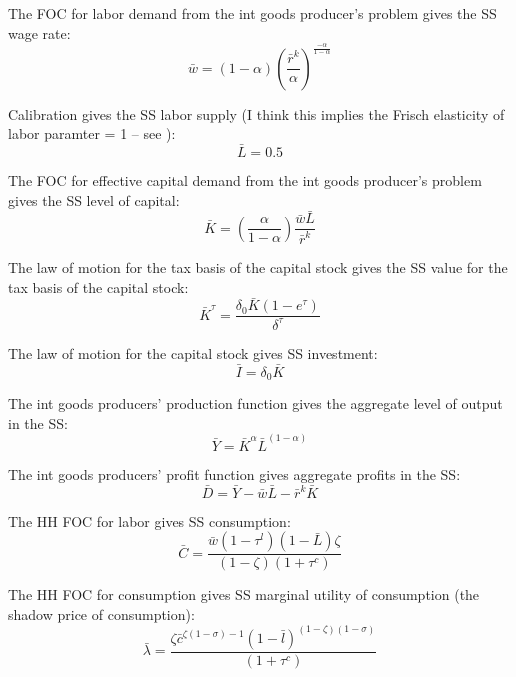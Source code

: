 The FOC for labor demand from the int goods producer's problem gives the SS wage rate:
\begin{equation}
\bar{w} = (1-\alpha)\left(\frac{\bar{r}^{k}}{\alpha}\right)^{\frac{-\alpha}{1-\alpha}}
\end{equation}

Calibration gives the SS labor supply (I think this implies the Frisch elasticity of labor paramter = 1 -- see ):
\begin{equation}
\bar{L} = 0.5
\end{equation}

The FOC for effective capital demand from the int goods producer's problem gives the SS level of capital:
\begin{equation}
\bar{K} = \left(\frac{\alpha}{1-\alpha}\right)\frac{\bar{w}\bar{L}}{\bar{r}^{k}}
\end{equation}

The law of motion for the tax basis of the capital stock gives the SS value for the tax basis of the capital stock:
\begin{equation}
\bar{K}^{\tau} = \frac{\delta_{0}\bar{K}(1-e^{\tau})}{\delta^{\tau}}
\end{equation}

The law of motion for the capital stock gives SS investment:
\begin{equation}
\bar{I} = \delta_{0}\bar{K}
\end{equation}

The int goods producers' production function gives the aggregate level of output in the SS:
\begin{equation}
\bar{Y} = \bar{K}^{\alpha}\bar{L}^{(1-\alpha)}
\end{equation}

The int goods producers' profit function gives aggregate profits in the SS:
\begin{equation}
\bar{D} = \bar{Y} - \bar{w}\bar{L} - \bar{r}^{k}\bar{K}
\end{equation}


The HH FOC for labor gives SS consumption:
\begin{equation}
\bar{C} = \frac{\bar{w}(1-\tau^{l})(1-\bar{L})\zeta}{(1-\zeta)(1+\tau^{c})}
\end{equation}

The HH FOC for consumption gives SS marginal utility of consumption (the shadow price of consumption):
\begin{equation}
\bar{\lambda} = \frac{\zeta \bar{c}^{\zeta(1-\sigma)-1}(1-\bar{l})^{(1-\zeta)(1-\sigma)}}{(1+\tau^{c})}
\end{equation}

